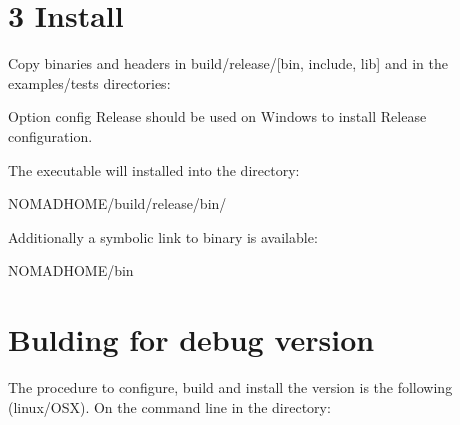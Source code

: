 \documentclass[letterpaper,10pt,english]{sphinxmanual}
\begin{document}
\section{3\sphinxhyphen{} Install}
\label{\detokenize{Installation:install}}
\sphinxAtStartPar
Copy binaries and headers in build/release/{[}bin, include, lib{]} and in the examples/tests directories:

\begin{sphinxVerbatim}[commandchars=\\\{\}]
  
\end{sphinxVerbatim}

\sphinxAtStartPar
Option \textendash{}config Release should be used on Windows to install Release configuration.

\sphinxAtStartPar
The executable  will installed into the directory:

\begin{sphinxVerbatim}[commandchars=\\\{\}]
\PYGZdl{}NOMAD\PYGZus{}HOME/build/release/bin/
\end{sphinxVerbatim}

\sphinxAtStartPar
Additionally a symbolic link to  binary is available:

\begin{sphinxVerbatim}[commandchars=\\\{\}]
\PYGZdl{}NOMAD\PYGZus{}HOME/bin
\end{sphinxVerbatim}


\section{Bulding for debug version}
\label{\detokenize{Installation:bulding-for-debug-version}}
\sphinxAtStartPar
The procedure to configure, build and install the  version is the following (linux/OSX). On the command line in the  directory:

\begin{sphinxVerbatim}[commandchars=\\\{\}]
      

  

  
\end{sphinxVerbatim}
\end{document}
